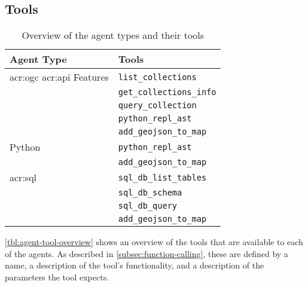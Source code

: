 \subsection{Tools}
\label{subsec:tools}

\begin{table}[h]
    \centering
    \caption{Overview of the agent types and their tools}
    \label{tbl:agent-tool-overview}
    \begin{tabularx}{0.7\textwidth}{XX}
        \toprule
        \textbf{Agent Type}                            & \textbf{Tools}                  \\
        \midrule
        \acrshort{acr:ogc} \acrshort{acr:api} Features & \texttt{list\_collections}      \\
                                                       & \texttt{get\_collections\_info} \\
                                                       & \texttt{query\_collection}      \\
                                                       & \texttt{python\_repl\_ast}      \\
                                                       & \texttt{add\_geojson\_to\_map}  \\
        \midrule
        Python                                         & \texttt{python\_repl\_ast}      \\
                                                       & \texttt{add\_geojson\_to\_map}  \\
        \midrule
        \acrshort{acr:sql}                             & \texttt{sql\_db\_list\_tables}  \\
                                                       & \texttt{sql\_db\_schema}        \\
                                                       & \texttt{sql\_db\_query}         \\
                                                       & \texttt{add\_geojson\_to\_map}  \\
        \bottomrule
    \end{tabularx}
\end{table}

\autoref{tbl:agent-tool-overview} shows an overview of the tools that are available to each of the agents. As described in \autoref{subsec:function-calling}, these are defined by a name, a description of the tool's functionality, and a description of the parameters the tool expects.

